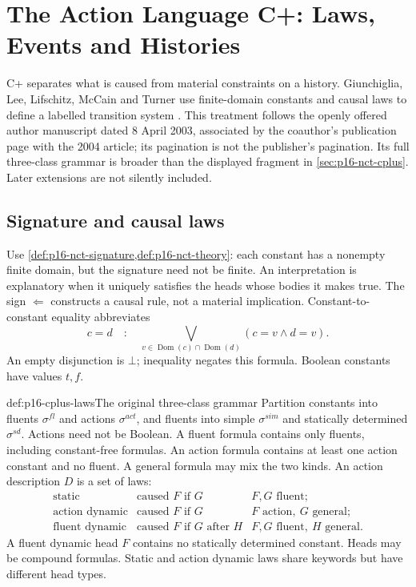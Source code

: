 \chapter{The Action Language C+: Laws, Events and Histories}
\label{sec:p16-cplus-action-language}

C+ separates what is caused from material constraints on a history.
Giunchiglia, Lee, Lifschitz, McCain and Turner use finite-domain constants
and causal laws to define a labelled transition system
\cite[Sections~4--5, Appendix~B]{GiunchigliaEtAl2003CplusAuthor}.
This treatment follows the openly offered author manuscript dated
8 April 2003, associated by the coauthor's publication page with the
2004 article; its pagination is not the publisher's pagination.
Its full three-class grammar is broader than the displayed fragment in
\cref{sec:p16-nct-cplus}. Later extensions are not silently included.

\section{Signature and causal laws}
\label{sec:p16-cplus-grammar}

Use \cref{def:p16-nct-signature,def:p16-nct-theory}: each constant
has a nonempty finite domain, but the signature need not be finite.
An interpretation is explanatory when it uniquely satisfies the heads
whose bodies it makes true. The sign \(\Leftarrow\) constructs a causal
rule, not a material implication.
Constant-to-constant equality abbreviates
\[
 c=d\quad:\quad
 \bigvee_{v\in\operatorname{Dom}(c)\cap\operatorname{Dom}(d)}
                        (c=v\land d=v).
\]
An empty disjunction is \(\bot\); inequality negates this formula.
Boolean constants have values \(t,f\).

\begin{hbdefinition}{def:p16-cplus-laws}{The original three-class grammar}
Partition constants into fluents \(\sigma^{fl}\) and actions
\(\sigma^{act}\), and fluents into simple \(\sigma^{sim}\) and
statically determined \(\sigma^{sd}\).
Actions need not be Boolean.
A fluent formula contains only fluents, including constant-free formulas.
An action formula contains at least one action constant and no fluent.
A general formula may mix the two kinds.
An action description \(D\) is a set of laws:
\[
\begin{array}{lll}
 \text{static}&\text{caused }F\text{ if }G&
                         F,G\text{ fluent};\\
 \text{action dynamic}&\text{caused }F\text{ if }G&
                         F\text{ action},\ G\text{ general};\\
 \text{fluent dynamic}&\text{caused }F\text{ if }G\text{ after }H&
                         F,G\text{ fluent},\ H\text{ general}.
\end{array}
\]
A fluent dynamic head \(F\) contains no statically determined constant.
Heads may be compound formulas. Static and action dynamic laws share
keywords but have different head types.
\end{hbdefinition}

